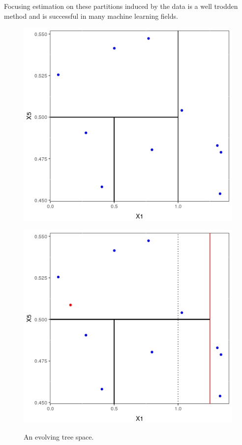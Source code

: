 \documentclass[a1paper,portrait, fontscale=0.45]{baposter}
\begin{document}
\begin{poster}
{{Focusing estimation on these partitions induced by the data is a well trodden method and is successful in many machine learning fields.}

\begin{figure}[H]
\hspace{1em}
\begin{minipage}[c]{0.4\linewidth}
\includegraphics[width=\linewidth]{tree1.jpeg}
\label{fig:xparts1}
\end{minipage}
\hspace{1.5em}
\begin{minipage}[c]{0.4\linewidth}
\includegraphics[width=\linewidth]{tree2.jpeg}
\label{fig:xparts2}
\end{minipage}
\vspace{-1em}
\caption{An evolving tree space.}
\end{figure}

}
\end{poster}
\end{document}
